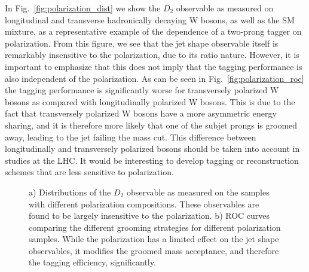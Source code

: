 \documentclass[11pt,letterpaper]{article}
\DeclareRobustCommand{\Fig}[1]{Fig.~\ref{#1}}
\begin{document}
In \Fig{fig:polarization_dist} we show the $D_2$ observable as measured on longitudinal and transverse hadronically decaying W bosons, as well as the SM mixture, as a representative example of the dependence of a two-prong tagger on polarization. From this figure, we see that the jet shape observable itself is remarkably insensitive to the polarization, due to its ratio nature. However, it is important to emphasize that this does not imply that the tagging performance is also independent of the polarization. As can be seen in \Fig{fig:polarization_roc} the tagging performance is significantly worse for transversely polarized W bosons as compared with longitudinally polarized W bosons. This is due to the fact that transversely polarized W bosons have a more asymmetric energy sharing, and it is therefore more likely that one of the subjet prongs is groomed away, leading to the jet failing the mass cut. This difference between longitudinally and transversely polarized bosons should be taken into account in studies at the LHC. It would be interesting to develop tagging or reconstruction schemes that are less sensitive to polarization.




\begin{figure}
\begin{center}
\end{center}
\caption{a) Distributions of the $D_2$ observable as measured on the samples with different polarization compositions. These observables are found to be largely insensitive to the polarization. b) ROC curves comparing the different grooming strategies for different polarization samples. While the polarization has a limited effect on the jet shape observables, it modifies the groomed mass acceptance, and therefore the tagging efficiency, significantly.}
\end{figure}
\end{document}
